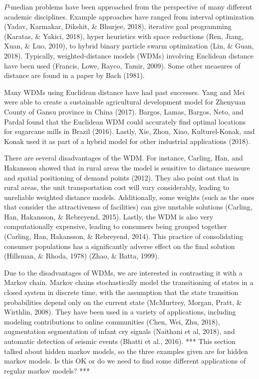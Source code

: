 \documentclass[twoside,twocolumn]{article}
\begin{document}
$P$-median problems have been approached from the perspective of many different academic disciplines.
Example approaches have ranged from interval optimization (Yadav, Karmakar, Dikshit, \& Bhurjee, 2018), iterative goal programming (Karatas, \& Yakici, 2018), hyper heuristics with space reductions (Ren, Jiang, Xuan, \& Luo, 2010), to hybrid binary particle swarm optimization (Lin, \& Guan, 2018).
Typically, weighted-distance models (WDMs) involving Euclidean distance have been used (Francis, Lowe, Rayco, Tamir, 2009).
Some other measures of distance are found in a paper by Bach (1981).

Many WDMs using Euclidean distance have had past successes.
Yang and Mei were able to create a sustainable agricultural development model for Zhenyuan County of Gansu province in China (2017).
Bargos, Lamas, Bargos, Neto, and Pardal found that the Euclidean WDM could accurately find optimal locations for sugarcane mills in Brazil (2016).
Lastly, Xie, Zhou, Xiao, Kulturel-Konak, and Konak used it as part of a hybrid model for other industrial applications (2018).

There are several disadvantages of the WDM.
For instance, Carling, Han, and Hakansson showed that in rural areas the model is sensitive to distance measure and spatial positioning of demand points (2012).
They also point out that in rural areas, the unit transportation cost will vary considerably, leading to unreliable weighted distance models.
Additionally, some weights (such as the ones that consider the attractiveness of facilities) can give unstable solutions (Carling, Han, Hakansson, \& Rebreyend, 2015).
Lastly, the WDM is also very computationally expensive, leading to consumers being grouped together (Carling, Han, Hakansson, 
\& Rebreyend, 2014). 
This practice of consolidating consumer populations has a significantly adverse effect on the final solution (Hillsman, \& Rhoda, 1978) (Zhao, \& Batta, 1999).

Due to the disadvantages of WDMs, we are interested in contrasting it with a Markov chain.
Markov chains stochastically model the transitioning of states in a closed system in discrete time, with the assumption that the state transition probabilities depend only on the current state (McMurtrey, Morgan, Pratt, \& Wirthlin, 2008).
They have been used in a variety of applications, including modeling contributions to online communities (Chen, Wei, Zhu, 2018), augmentation segmentation of infant cry signals (Naithani et al, 2018), and automatic detection of seismic events (Bhatti et al., 2016).
*** This section talked about hidden markov models, so the three examples given are for hidden markov models.  Is this OK or do we need to find some different applications of regular markov models? ***
\end{document}
